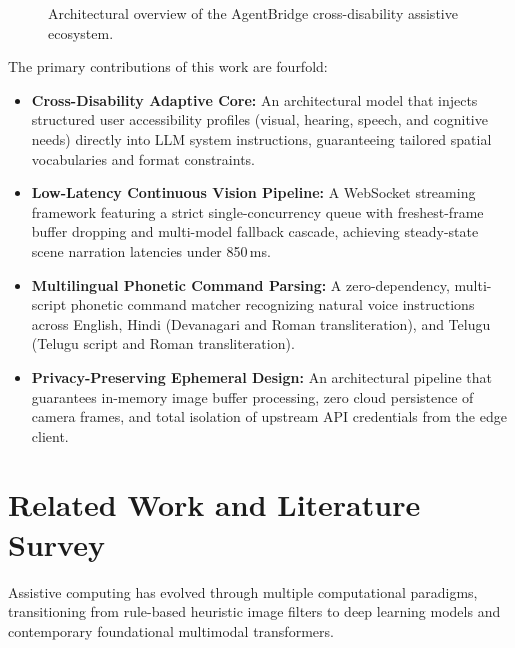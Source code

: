 \documentclass[10pt,a4paper]{article}
\begin{document}
\begin{figure}[htbp]
    \caption{Architectural overview of the AgentBridge cross-disability assistive ecosystem.}
    \label{fig:agentbridge_architecture}
\end{figure}

The primary contributions of this work are fourfold:
\begin{itemize}
    \item \textbf{Cross-Disability Adaptive Core:} An architectural model that injects structured user accessibility profiles (visual, hearing, speech, and cognitive needs) directly into LLM system instructions, guaranteeing tailored spatial vocabularies and format constraints.
    \item \textbf{Low-Latency Continuous Vision Pipeline:} A WebSocket streaming framework featuring a strict single-concurrency queue with freshest-frame buffer dropping and multi-model fallback cascade, achieving steady-state scene narration latencies under 850\,ms.
    \item \textbf{Multilingual Phonetic Command Parsing:} A zero-dependency, multi-script phonetic command matcher recognizing natural voice instructions across English, Hindi (Devanagari and Roman transliteration), and Telugu (Telugu script and Roman transliteration).
    \item \textbf{Privacy-Preserving Ephemeral Design:} An architectural pipeline that guarantees in-memory image buffer processing, zero cloud persistence of camera frames, and total isolation of upstream API credentials from the edge client.
\end{itemize}

\section{Related Work and Literature Survey}

Assistive computing has evolved through multiple computational paradigms, transitioning from rule-based heuristic image filters to deep learning models and contemporary foundational multimodal transformers.
\end{document}
